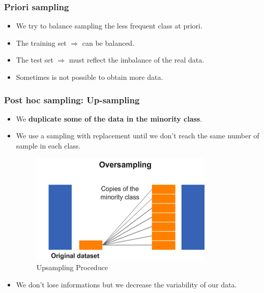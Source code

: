 \documentclass[9pt]{beamer}
\begin{document}
\begin{frame}
\frametitle{Priori sampling}
\begin{itemize}
\item<1->  We try to balance sampling the less frequent class at priori.
\item<2->  The training set $\Rightarrow$  can be balanced.
\item<3->  The test set $\Rightarrow$ must reflect the imbalance of the real data.
\item<4->  Sometimes is not possible to obtain more data.
\end{itemize}
\end{frame}

\begin{frame}
\frametitle{Post hoc sampling: Up-sampling}
\begin{itemize}
\item<1->  We \textbf{duplicate some of the data in the minority class}.

\item<2->  We use a sampling with replacement until we don't reach the same number of sample in each class.
\begin{figure}[ht]
\includegraphics[scale=0.60]{images/Upsampling.png}
\caption{Upsampling Proceduce}
\end{figure}
\item<3->  We don't lose informations but we decrease the variability of our data.

\end{itemize}
\end{frame}
\end{document}
